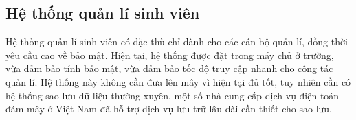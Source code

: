 \documentclass{article}
\begin{document}
\subsection{Hệ thống quản lí sinh viên}

Hệ thống quản lí sinh viên có đặc thù chỉ dành cho các cán bộ quản lí, đồng thời
yêu cầu cao về bảo mật. Hiện tại, hệ thống được đặt trong máy chủ ở trường, vừa
đảm bảo tính bảo mật, vừa đảm bảo tốc độ truy cập nhanh cho công tác quản lí. Hệ
thống này không cần đưa lên mây vì hiện tại đủ tốt, tuy nhiên cần có hệ thống
sao lưu dữ liệu thường xuyên, một số nhà cung cấp dịch vụ điện toán đám mây ở
Việt Nam đã hỗ trợ dịch vụ lưu trữ lâu dài cần thiết cho sao lưu.

\printbibliography
\end{document}
